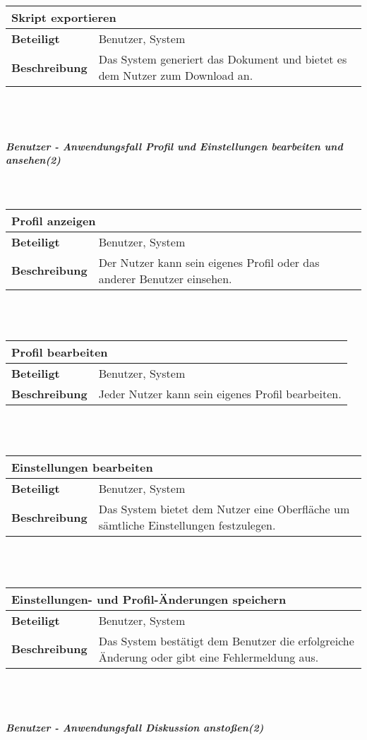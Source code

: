 \documentclass[12pt,a4paper]{article}
\begin{document}
\begin{tabular}{l p{10cm}}
\multicolumn{2}{l}{\textbf{Skript exportieren}} \\ \hline
\textbf{Beteiligt} & Benutzer, System \\ \hline 
\textbf{Beschreibung} & Das System generiert das Dokument und bietet es dem Nutzer zum Download an.\\ 
\hline 
\end{tabular}\\\\
\subparagraph{Benutzer - Anwendungsfall \glqq Profil und Einstellungen bearbeiten und ansehen\grqq  (2)}\mbox{}\\

\begin{tabular}{l p{10cm}}
\multicolumn{2}{l}{\textbf{Profil anzeigen}} \\ \hline
\textbf{Beteiligt} & Benutzer, System \\ \hline 
\textbf{Beschreibung} & Der Nutzer kann sein eigenes Profil oder das anderer Benutzer einsehen.\\ 
\hline 
\end{tabular}\\\\

\begin{tabular}{l p{10cm}}
\multicolumn{2}{l}{\textbf{Profil bearbeiten}} \\ \hline
\textbf{Beteiligt} & Benutzer, System \\ \hline 
\textbf{Beschreibung} & Jeder Nutzer kann sein eigenes Profil bearbeiten.\\ 
\hline 
\end{tabular}\\\\

\begin{tabular}{l p{10cm}}
\multicolumn{2}{l}{\textbf{Einstellungen bearbeiten}} \\ \hline
\textbf{Beteiligt} & Benutzer, System \\ \hline 
\textbf{Beschreibung} & Das System bietet dem Nutzer eine Oberfläche um sämtliche Einstellungen festzulegen.\\ 
\hline 
\end{tabular}\\\\

\begin{tabular}{l p{10cm}}
\multicolumn{2}{l}{\textbf{Einstellungen- und Profil-Änderungen speichern}} \\ \hline
\textbf{Beteiligt} & Benutzer, System \\ \hline 
\textbf{Beschreibung} & Das System bestätigt dem Benutzer die erfolgreiche Änderung oder gibt eine Fehlermeldung aus.\\ 
\hline 
\end{tabular}\\\\
\subparagraph{Benutzer - Anwendungsfall \glqq Diskussion anstoßen\grqq (2)}\mbox{}\\
\end{document}
